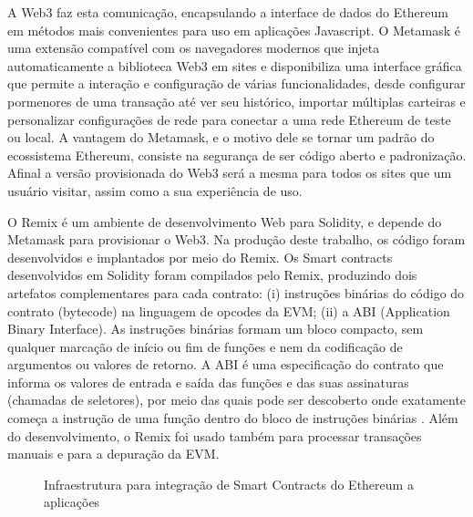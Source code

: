 \documentclass[a4paper,11pt]{article}
\begin{document}
A Web3 faz esta comunicação, encapsulando a interface de dados do Ethereum em métodos mais convenientes para uso em aplicações Javascript.
O Metamask é uma extensão compatível com os navegadores modernos que injeta automaticamente a biblioteca Web3 em sites e disponibiliza uma interface gráfica que permite a interação e configuração de várias funcionalidades, desde configurar pormenores de uma transação até ver seu histórico, importar múltiplas carteiras e personalizar configurações de rede para conectar a uma rede Ethereum de teste ou local.
A vantagem do Metamask, e o motivo dele se tornar um padrão do ecossistema Ethereum, consiste na segurança de ser código aberto e padronização. Afinal a versão provisionada do Web3 será a mesma para todos os sites que um usuário visitar, assim como a sua experiência de uso. %

O Remix é um ambiente de desenvolvimento Web para Solidity, e depende do Metamask para provisionar o Web3.
Na produção deste trabalho, os código foram desenvolvidos e implantados por meio do Remix. %
Os Smart contracts desenvolvidos em Solidity foram compilados pelo Remix, produzindo dois artefatos complementares para cada contrato: (i) instruções binárias do código do contrato (bytecode) na linguagem de opcodes da EVM; (ii) a ABI (Application Binary Interface).
As instruções binárias formam um bloco compacto, sem qualquer marcação de início ou fim de funções e nem da codificação de argumentos ou valores de retorno.
A ABI é uma especificação do contrato que informa os valores de entrada e saída das funções e das suas assinaturas (chamadas de seletores), por meio das quais pode ser descoberto onde exatamente começa a instrução de uma função dentro do bloco de instruções binárias \cite{Solidity2020}.
Além do desenvolvimento, o Remix foi usado também para processar transações manuais e para a depuração da EVM.

\begin{figure}[!h]
  \centering
  
  \caption{Infraestrutura para integração de Smart Contracts do Ethereum a aplicações}
  \label{fig:infraestruturaBlockchain}
\end{figure}
\end{document}
